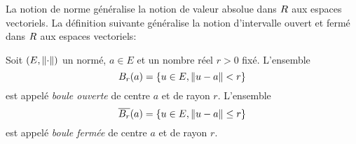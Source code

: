                         La notion de norme généralise la notion de valeur absolue dans $R$ aux espaces vectoriels. La définition suivante généralise la notion d'intervalle ouvert et fermé dans $R$ aux espaces vectoriels:  

                        \begin{definition}
                            Soit $(E,\left\lVert\cdot\right\rVert)$ un \rev{} normé, $a\in E$  et un nombre réel $r>0 $ fixé. L'ensemble 
                            \[
                            B_r(a) = \{ u \in E, \left\lVert u-a\right\rVert<r \}\]  est appelé \emph{boule ouverte} de centre $a$ et de rayon $r$. L'ensemble \[\overline{B_r}(a) = \{ u \in E, \left\lVert u-a\right\rVert\leq r \}\] est appelé \emph{boule fermée} de centre $a$ et de rayon $r$. 
                        \end{definition}

